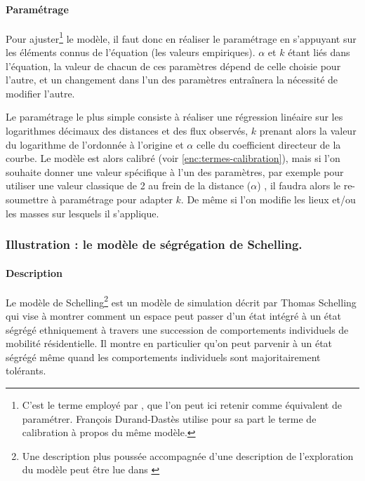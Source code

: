 \documentclass[12pt, a4paper, oneside]{book}
\begin{document}
	\paragraph{Paramétrage} Pour \og ajuster\fg{}\footnote{C'est le terme employé par \autocite{pumain_les_2001}, que l'on peut ici retenir comme équivalent de paramétrer. François Durand-Dastès  \autocite[298]{durand1995modeles} utilise pour sa part le terme de calibration à propos du même modèle.} le modèle, il faut donc en réaliser le paramétrage en s'appuyant sur les éléments connus de l'équation (les valeurs empiriques).
	$\alpha$ et $k$ étant liés dans l'équation, la valeur de chacun de ces paramètres dépend de celle choisie pour l'autre, et un changement dans l'un des paramètres entraînera la nécessité de modifier l'autre.
	
	Le paramétrage le plus simple consiste à réaliser une régression linéaire sur les logarithmes décimaux des distances et des flux observés, $k$ prenant alors la valeur du logarithme de l'ordonnée à l'origine et $\alpha$ celle du coefficient directeur de la courbe.	
	Le modèle est alors calibré (voir \cref{enc:termes-calibration}), mais si l'on souhaite donner une valeur spécifique à l'un des paramètres, par exemple pour utiliser une valeur classique de 2 au frein de la distance ($\alpha$) \autocite{pumain_modegravitaire_2004}, il faudra alors le re-soumettre à paramétrage pour adapter $k$. De même si l'on modifie les lieux et/ou les masses sur lesquels il s'applique.
	
	
	\subsubsection{Illustration : le modèle de ségrégation de Schelling.\label{desc:schelling}}
	
	\paragraph{Description}Le modèle de Schelling\footnote{Une description plus poussée accompagnée d'une description de l'exploration du modèle peut être lue dans \autocite{daude_comparaison_2006}} est un modèle de simulation décrit par Thomas Schelling \autocite{schelling_dynamic_1971} qui vise à montrer comment un espace peut passer d'un état intégré à un état ségrégé ethniquement à travers une succession de comportements individuels de mobilité résidentielle. Il montre en particulier qu'on peut parvenir à un état ségrégé même quand les comportements individuels sont majoritairement tolérants.
	
\end{document}
